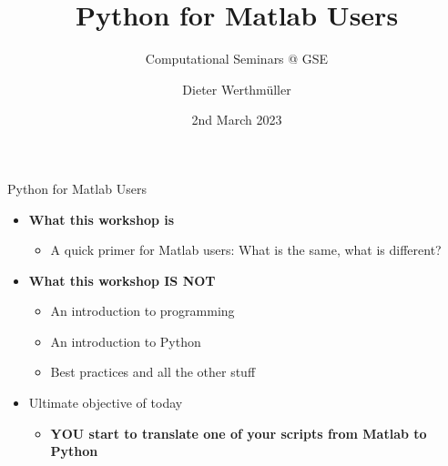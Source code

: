 \documentclass[usepdftitle=false, aspectratio=169]{beamer}
\title{Python for Matlab Users}
\subtitle{Computational Seminars @ GSE}
\date{2nd March 2023}
\author{Dieter Werthmüller}
\institute{\dra\href{https://github.com/prisae/Python4MatlabUsers}{github.com/prisae/Python4MatlabUsers}}
\newcommand{\ato}{\addtocounter{framenumber}{1}}
\begin{document}

\ato %
\maketitle




\begin{frame}
  {Python for Matlab Users}

  \begin{itemize}\itemsep .6cm
    \item \textbf{What this workshop is}
      \begin{itemize}
        \item A quick primer for Matlab users: What is the same, what is different?
      \end{itemize}
    \item \textbf{What this workshop IS NOT}
      \begin{itemize}
        \item An introduction to programming
        \item An introduction to Python
        \item Best practices and all the other stuff
      \end{itemize}
    \item Ultimate objective of today
      \begin{itemize}
        \item \textbf{YOU start to translate one of your scripts from Matlab to
          Python}
      \end{itemize}
  \end{itemize}
\end{frame}
\end{document}
